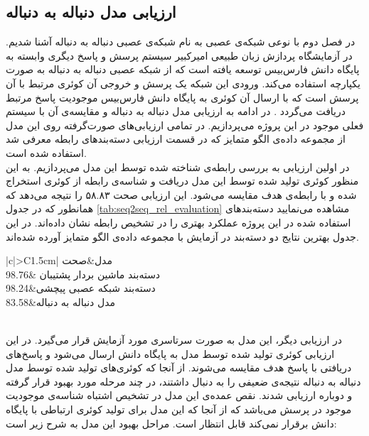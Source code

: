 \subsection{ارزیابی مدل دنباله به دنباله}
در فصل دوم با نوعی شبکه‌ی عصبی به نام شبکه‌ی عصبی دنباله به دنباله آشنا شدیم. در آزمایشگاه پردازش زبان طبیعی امیرکبیر سیستم پرسش و پاسخ دیگری وابسته به پایگاه دانش فارس‌بیس توسعه یافته است که از شبکه عصبی دنباله به دنباله به صورت یکپارچه استفاده می‌کند. ورودی این شبکه یک پرسش و خروجی آن کوئری مرتبط با آن پرسش است که با ارسال آن کوئری به پایگاه دانش فارس‌بیس موجودیت پاسخ مرتبط دریافت می‌گردد \cite{persian_seq2seq}.
در ادامه به ارزیابی مدل دنباله به دنباله و مقایسه‌ی آن با سیستم فعلی موجود در این پروژه می‌پردازیم. در تمامی ارزیابی‌های صورت‌گرفته روی این مدل از مجموعه داده‌ی الگو متمایز که در قسمت ارزیابی دسته‌بندهای رابطه معرفی شد استفاده شده است.
\\
در اولین ارزیابی به بررسی رابطه‌ی شناخته شده توسط این مدل می‌پردازیم. به این منظور کوئری تولید شده توسط این مدل دریافت و شناسه‌ی رابطه از کوئری استخراج شده و با رابطه‌ی هدف مقایسه می‌شود. ‌این ارزیابی صحت ۵۸.۸۳\lr{\%} را نتیجه می‌دهد که همانطور که در جدول \ref{tab:seq2seq_rel_evaluation} مشاهده می‌نمایید دسته‌بندهای استفاده شده در این پروژه عملکرد بهتری را در تشخیص رابطه نشان داده‌اند. در این جدول بهترین نتایج دو دسته‌بند در آزمایش با مجموعه داده‌ی الگو متمایز آورده شده‌اند.
\begin{table}[h]
	\centering
	\def\arraystretch{1.5}
	\setlength{\tabcolsep}{12pt}
	\begin{tabular}{|c|>{\setlatin}C{1.5cm}|}
		\hline
		مدل&صحت
		\\ \hline
		دسته‌بند ماشین بردار پشتیبان &98.76
		\\ \hline
		دسته‌بند شبکه عصبی پیچشی&98.24
		\\ \hline
		مدل دنباله به دنباله&83.58
		\\ \hline
	\end{tabular}	
	\caption{مقایسه‌ی مدل دنباله به دنباله و دسته‌بندهای سیستم در تشخیص رابطه}
	\label{tab:seq2seq_rel_evaluation}
\end{table}
\\در ارزیابی دیگر، این مدل به صورت سرتاسری مورد آزمایش قرار می‌گیرد. در این ارزیابی کوئری تولید شده توسط مدل به پایگاه دانش ارسال می‌شود و پاسخ‌های دریافتی با پاسخ هدف مقایسه می‌شوند. از آنجا که کوئری‌های تولید شده توسط مدل دنباله به دنباله نتیجه‌ی ضعیفی را به دنبال داشتند، در چند مرحله مورد بهبود قرار گرفته و دوباره ارزیابی شدند. نقص عمده‌ی این مدل در تشخیص اشتباه شناسه‌ی موجودیت موجود در پرسش می‌باشد که از آنجا که این مدل برای تولید کوئری ارتباطی با پایگاه دانش برقرار نمی‌کند قابل انتظار است. مراحل بهبود این مدل به شرح زیر است:
